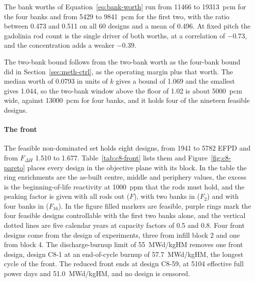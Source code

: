 The bank worths of Equation~\eqref{eq:bank-worth} run from
\num{11466} to \SI{19313}{pcm} for the four banks and from
\num{5429} to \SI{9841}{pcm} for the first two, with the ratio between
\num{0.473} and \num{0.511} on all 60 designs and a mean of
\num{0.496}. At fixed pitch the gadolinia rod count is the single
driver of both worths, at a correlation of $-0.73$, and the
concentration adds a weaker $-0.39$.

The two-bank bound follows from the two-bank worth as the four-bank
bound did in Section~\ref{sec:meth-ctrl}, as the operating margin
plus that worth. The median worth of \num{0.0793} in units of $k$ gives
a bound of 1.069 and the smallest gives 1.044, so the two-bank window
above the floor of 1.02 is about \SI{5000}{pcm} wide, against
\SI{13000}{pcm} for four banks, and it holds four of the nineteen
feasible designs.

\paragraph{The front}
\label{sec:res-c8-front}

The feasible non-dominated set holds eight designs, from 1941 to 5782
EFPD and from $F_{\Delta H}$ 1.510 to 1.677. Table~\ref{tab:c8-front}
lists them and Figure~\ref{fig:c8-pareto} places every design in the
objective plane with its block. In the table the ring enrichments are
the as-built centre, middle and periphery values, the excess is the
beginning-of-life reactivity at \SI{1000}{ppm} that the rods must hold,
and the peaking factor is given with all rods out ($F$), with two banks
in ($F_2$) and with four banks in ($F_{16}$). In the figure filled
markers are feasible, purple rings mark the four feasible designs
controllable with the first two banks alone, and the vertical dotted
lines are five calendar years at capacity factors of 0.5 and 0.8. Four
front designs come from the
design of experiments, three from infill block 2 and one from block 4.
The discharge-burnup limit of \SI{55}{MWd/kgHM} removes one front design,
design C8-1 at an end-of-cycle burnup of \SI{57.7}{MWd/kgHM}, the longest
cycle of the front. The reduced front ends at design C8-59, at
\num{5104} effective full power days and \SI{51.0}{MWd/kgHM}, and no
design is censored.

